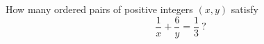 How many ordered pairs of positive integers $(x,y)$ satisfy
\[
\dfrac{1}{x}+\dfrac{6}{y}=\dfrac{1}{3}\ ?
\]
